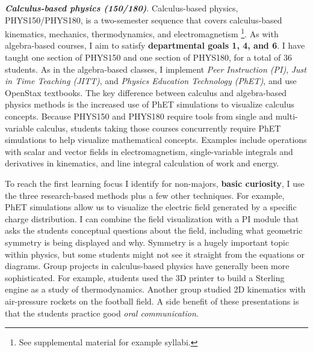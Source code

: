 \documentclass[../../../main.tex]{subfiles}
\begin{document}
\textbf{\textit{Calculus-based physics (150/180)}}. Calculus-based physics, PHYS150/PHYS180, is a two-semester sequence that covers calculus-based kinematics, mechanics, thermodynamics, and electromagnetism \footnote{See supplemental material for example syllabi.}.  As with algebra-based courses, I aim to satisfy \textbf{departmental goals 1, 4, and 6}.  I have taught one section of PHYS150 and one section of PHYS180, for a total of 36 students.  As in the algebra-based classes, I implement \textit{Peer Instruction (PI)}, \textit{Just in Time Teaching (JITT)}, and \textit{Physics Education Technology (PhET)}, and use OpenStax textbooks.  The key difference between calculus and algebra-based physics methods is the increased use of PhET simulations to visualize calculus concepts.  Because PHYS150 and PHYS180 require tools from single and multi-variable calculus, students taking those courses concurrently require PhET simulations to help visualize mathematical concepts.  Examples include operations with scalar and vector fields in electromagnetism, single-variable integrals and derivatives in kinematics, and line integral calculation of work and energy. \\ \hspace{0.1cm}

To reach the first learning focus I identify for non-majors, \textbf{basic curiosity}, I use the three research-based methods plus a few other techniques.  For example, PhET simulations allow us to visualize the electric field generated by a specific charge distribution.  I can combine the field visualization with a PI module that asks the students conceptual questions about the field, including what geometric symmetry is being displayed and why.  Symmetry is a hugely important topic within physics, but some students might not see it straight from the equations or diagrams.  Group projects in calculus-based physics have generally been more sophisticated.  For example, students used the 3D printer to build a Sterling engine as a study of thermodynamics.  Another group studied 2D kinematics with air-pressure rockets on the football field.  A side benefit of these presentations is that the students practice good \textit{oral communication.} \\ \hspace{0.1cm}
\end{document}
